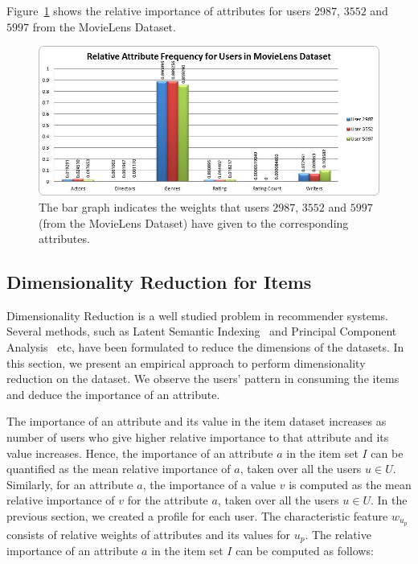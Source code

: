 \documentclass{acm_proc_article-sp}
\begin{document}
Figure~\ref{attribRelFreq_user} shows the relative importance of attributes for users $2987$, $3552$ and $5997$ from the MovieLens Dataset.

\begin{figure}[htp]
\centering
\includegraphics[scale=0.3]{Results/attribRelFreq_user.jpg}
\caption{The bar graph indicates the weights that users $2987$, $3552$ and $5997$ (from the MovieLens Dataset) have given to the corresponding attributes.}
\label{attribRelFreq_user}
\end{figure}

\subsection{Dimensionality Reduction for Items}
\label{sec:dimRed}

Dimensionality Reduction is a well studied problem in recommender systems. Several methods, such as Latent Semantic Indexing~\cite{badrul} and Principal Component Analysis~\cite{cureton} etc, have been formulated to reduce the dimensions of the datasets. In this section, we present an empirical approach to perform dimensionality reduction on the dataset. We observe the users' pattern in consuming the items and deduce the importance of an attribute.

The importance of an attribute and its value in the item dataset increases as number of users who give higher relative importance to that attribute and its value increases. Hence, the importance of an attribute $a$ in the item set $I$ can be quantified as the mean relative importance of $a$, taken over all the users $u \in U$. Similarly, for an attribute $a$, the importance of a value $v$ is computed as the mean relative importance of $v$ for the attribute $a$, taken over all the users $u \in U$. In the previous section, we created a profile for each user. The characteristic feature $w_{u_p}$ consists of relative weights of attributes and its values for $u_p$. The relative importance of an attribute $a$ in the item set $I$ can be computed as follows:
\end{document}
